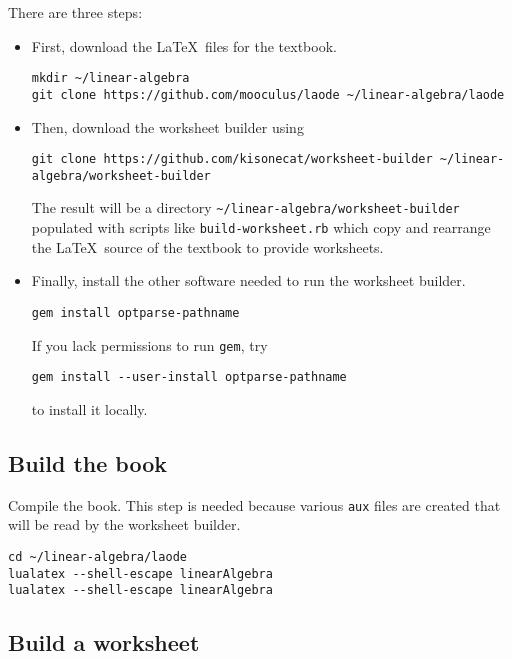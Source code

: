 \documentclass{article}
\begin{document}
There are three steps:
\begin{itemize}
\item First, download the \LaTeX\ files for the textbook.

\begin{verbatim}
mkdir ~/linear-algebra
git clone https://github.com/mooculus/laode ~/linear-algebra/laode
\end{verbatim}

\item Then, download the worksheet builder using
\begin{verbatim}
git clone https://github.com/kisonecat/worksheet-builder ~/linear-algebra/worksheet-builder
\end{verbatim}
The result will be a directory
\verb|~/linear-algebra/worksheet-builder| populated with scripts like
\verb|build-worksheet.rb| which copy and rearrange the \LaTeX\ source
of the textbook to provide worksheets.

\item Finally, install the other software needed to run the worksheet builder.

\begin{verbatim}
gem install optparse-pathname
\end{verbatim}

If you lack permissions to run \texttt{gem}, try

\begin{verbatim}
gem install --user-install optparse-pathname
\end{verbatim}

to install it locally.
\end{itemize}

\subsection{Build the book}\label{build-the-book}

Compile the book. This step is needed because various \texttt{aux} files
are created that will be read by the worksheet builder.

\begin{verbatim}
cd ~/linear-algebra/laode
lualatex --shell-escape linearAlgebra
lualatex --shell-escape linearAlgebra
\end{verbatim}

\subsection{Build a worksheet}\label{try-it}
\end{document}
